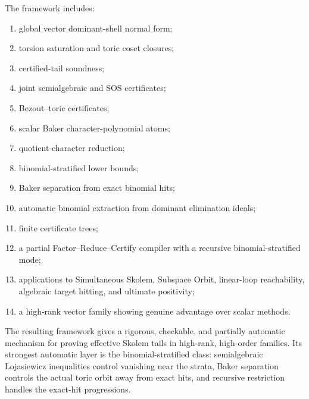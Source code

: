 \documentclass[11pt]{article}
\begin{document}
The framework includes:
\begin{enumerate}
\item global vector dominant-shell normal form;
\item torsion saturation and toric coset closures;
\item certified-tail soundness;
\item joint semialgebraic and SOS certificates;
\item Bezout--toric certificates;
\item scalar Baker character-polynomial atoms;
\item quotient-character reduction;
\item binomial-stratified lower bounds;
\item Baker separation from exact binomial hits;
\item automatic binomial extraction from dominant elimination ideals;
\item finite certificate trees;
\item a partial Factor--Reduce--Certify compiler with a recursive binomial-stratified mode;
\item applications to Simultaneous Skolem, Subspace Orbit, linear-loop reachability, algebraic target hitting, and ultimate positivity;
\item a high-rank vector family showing genuine advantage over scalar methods.
\end{enumerate}

The resulting framework gives a rigorous, checkable, and partially automatic mechanism for proving effective Skolem tails in high-rank, high-order families. Its strongest automatic layer is the binomial-stratified class: semialgebraic Lojasiewicz inequalities control vanishing near the strata, Baker separation controls the actual toric orbit away from exact hits, and recursive restriction handles the exact-hit progressions.
\end{document}
